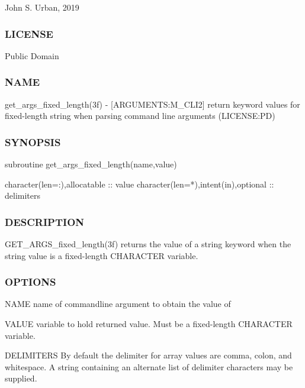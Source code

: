 John S. Urban, 2019 \subsubsection*{L\+I\+C\+E\+N\+SE}

Public Domain \subsubsection*{N\+A\+ME}

get\+\_\+args\+\_\+fixed\+\_\+length(3f) -\/ \mbox{[}A\+R\+G\+U\+M\+E\+N\+TS\+:M\+\_\+\+C\+L\+I2\mbox{]} return keyword values for fixed-\/length string when parsing command line arguments (L\+I\+C\+E\+N\+SE\+:PD)

\subsubsection*{S\+Y\+N\+O\+P\+S\+IS}

\begin{DoxyVerb}subroutine get_args_fixed_length(name,value)

 character(len=:),allocatable :: value
 character(len=*),intent(in),optional :: delimiters
\end{DoxyVerb}


\subsubsection*{D\+E\+S\+C\+R\+I\+P\+T\+I\+ON}

\begin{DoxyVerb}GET_ARGS_fixed_length(3f) returns the value of a string
keyword when the string value is a fixed-length CHARACTER
variable.
\end{DoxyVerb}


\subsubsection*{O\+P\+T\+I\+O\+NS}

\begin{DoxyVerb}NAME   name of commandline argument to obtain the value of

VALUE  variable to hold returned value.
       Must be a fixed-length CHARACTER variable.

DELIMITERS  By default the delimiter for array values are comma,
            colon, and whitespace. A string containing an alternate
            list of delimiter characters may be supplied.
\end{DoxyVerb}


